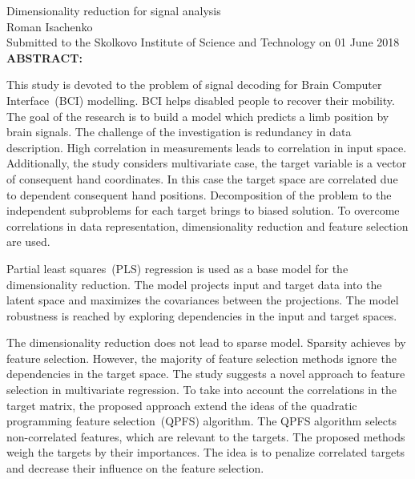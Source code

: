 \documentclass[12pt,oneside]{article}
\theoremstyle{definition}
\begin{document}
\setcounter{page}{3}
\begin{center}
	Dimensionality reduction for signal analysis\\ 
	Roman Isachenko \\[5mm]
	Submitted to the Skolkovo Institute of Science and Technology 
	on 01 June 2018 \\[5mm]
	\textbf{ABSTRACT:} 
\end{center}

This study is devoted to the problem of signal decoding for Brain Computer Interface~(BCI) modelling. 
BCI helps disabled people to recover their mobility.
The goal of the research is to build a model which predicts a limb position by brain signals. 
The challenge of the investigation is redundancy in data description. 
High correlation in measurements leads to correlation in input space. 
Additionally, the study considers multivariate case, the target variable is a vector of consequent hand coordinates. 
In this case the target space are correlated due to dependent consequent hand positions.
Decomposition of the problem to the independent subproblems for each target brings to biased solution.
To overcome correlations in data representation, dimensionality reduction and feature selection are used.

Partial least squares~(PLS) regression is used as a base model for the dimensionality reduction.
The model projects input and target data into the latent space and maximizes the covariances between the projections.
The model robustness is reached by exploring dependencies in the input and target spaces.

The dimensionality reduction does not lead to sparse model. Sparsity achieves by feature selection.
However, the majority of feature selection methods ignore the dependencies in the target space.
The study suggests a novel approach to feature selection in multivariate regression.
To take into account the correlations in the target matrix, the proposed approach extend the ideas of the quadratic programming feature selection~(QPFS) algorithm. 
The QPFS algorithm selects non-correlated features, which are relevant to the targets. 
The proposed methods weigh the targets by their importances.
The idea is to penalize correlated targets and decrease their influence on the feature selection. 
\end{document}
